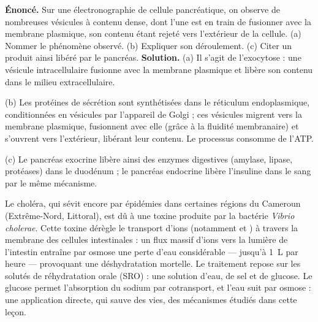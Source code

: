 \documentclass[11pt]{article}
\newcommand{\cle}[1]{{\popxbold\color{popdark}#1}}
\begin{document}
\begin{exoresolu}
\textbf{Énoncé.} Sur une électronographie de cellule pancréatique, on observe de nombreuses vésicules à contenu dense, dont l'une est en train de fusionner avec la membrane plasmique, son contenu étant rejeté vers l'extérieur de la cellule. (a) Nommer le phénomène observé. (b) Expliquer son déroulement. (c) Citer un produit ainsi libéré par le pancréas.
\tcblower
\textbf{Solution.}
(a) Il s'agit de l'\cle{exocytose} : une vésicule intracellulaire fusionne avec la membrane plasmique et libère son contenu dans le milieu extracellulaire.

(b) Les protéines de sécrétion sont synthétisées dans le réticulum endoplasmique, conditionnées en vésicules par l'appareil de Golgi ; ces vésicules migrent vers la membrane plasmique, fusionnent avec elle (grâce à la fluidité membranaire) et s'ouvrent vers l'extérieur, libérant leur contenu. Le processus consomme de l'ATP.

(c) Le pancréas exocrine libère ainsi des \cle{enzymes digestives} (amylase, lipase, protéases) dans le duodénum ; le pancréas endocrine libère l'\cle{insuline} dans le sang par le même mécanisme.
\end{exoresolu}

\begin{savaistu}
Le choléra, qui sévit encore par épidémies dans certaines régions du Cameroun (Extrême-Nord, Littoral), est dû à une toxine produite par la bactérie \emph{Vibrio cholerae}. Cette toxine dérègle le transport d'ions (notamment  et ) à travers la membrane des cellules intestinales : un flux massif d'ions vers la lumière de l'intestin entraîne par osmose une perte d'eau considérable — jusqu'à \SI{1}{L} par heure — provoquant une déshydratation mortelle. Le traitement repose sur les \cle{solutés de réhydratation orale} (SRO) : une solution d'eau, de sel et de glucose. Le glucose permet l'absorption du sodium par cotransport, et l'eau suit par osmose : une application directe, qui sauve des vies, des mécanismes étudiés dans cette leçon.
\end{savaistu}
\end{document}
